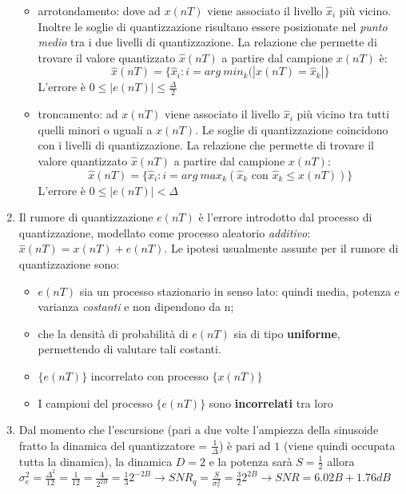 \documentclass[
]{article}
\begin{document}
\begin{enumerate}
  \begin{itemize}
  \item
    arrotondamento: dove ad \(x(nT)\) viene associato il livello
    \(\hat{x}_i\) più vicino. Inoltre le soglie di quantizzazione
    risultano essere posizionate nel \emph{punto medio} tra i due
    livelli di quantizzazione. La relazione che permette di trovare il
    valore quantizzato \(\hat{x}(nT)\) a partire dal campione \(x(nT)\)
    è: \[
    \hat{x}(nT) = \{\hat{x}_i : i=arg \ min_k (|x(nT)=\hat{x}_k| \}
    \] L'errore è \(0 \leq |e(nT)| \leq \frac{\Delta}{2}\)
  \item
    troncamento: ad \(x(nT)\) viene associato il livello \(\hat{x}_i\)
    più vicino tra tutti quelli minori o uguali a \(x(nT)\). Le soglie
    di quantizzazione coincidono con i livelli di quantizzazione. La
    relazione che permette di trovare il valore quantizzato
    \(\hat{x}(nT)\) a partire dal campione \(x(nT)\): \[
    \hat{x}(nT) = \{\hat{x}_i : i=arg \ max_k (\hat{x}_k \text{ con } \hat{x}_k \leq x(nT)) \}
    \] L'errore è \(0 \leq |e(nT)| < \Delta\)
  \end{itemize}
\item
  Il rumore di quantizzazione \(e(nT)\) è l'errore introdotto dal
  processo di quantizzazione, modellato come processo aleatorio
  \emph{additivo}: \(\hat{x}(nT)=x(nT)+e(nT)\). Le ipotesi usualmente
  assunte per il rumore di quantizzazione sono:

  \begin{itemize}
  \item
    \(e(nT)\) sia un processo stazionario in senso lato: quindi media,
    potenza e varianza \emph{costanti} e non dipendono da n;
  \item
    che la densità di probabilità di \(e(nT)\) sia di tipo
    \textbf{uniforme}, permettendo di valutare tali costanti.
  \item
    \(\{e(nT)\}\) incorrelato con processo \(\{x(nT)\}\)
  \item
    I campioni del processo \(\{e(nT)\}\) sono \textbf{incorrelati} tra
    loro
  \end{itemize}
\item
  Dal momento che l'escursione (pari a due volte l'ampiezza della
  sinusoide fratto la dinamica del quantizzatore = \(\frac{1}{\Delta}\))
  è pari ad \(1\) (viene quindi occupata tutta la dinamica), la dinamica
  \(D=2\) e la potenza sarà \(S=\frac{1}{2}\) allora
  \(\sigma^2_e = \frac{\Delta^2}{12}=\frac{1}{12} = \frac{4}{2^{2B}}=\frac{1}{3} 2^{-2B} \to SNR_q=\frac{S}{\sigma^2_e}=\frac{3}{2}2^{2B} \to SNR=6.02B+1.76dB\)
\end{enumerate}
\end{document}
